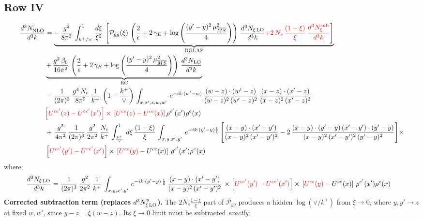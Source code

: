 \documentclass[9pt]{article}
\numberwithin{equation}{section}
\begin{document}
\subsection{Row IV}
\begin{align}
    \frac{d^{3}N_{\rm NLO}^{\rm}}{d^{3}k}  & =  
    \underbrace{-\,\frac{g^{2}}{8\pi^{2}}\,\int_{k^{+}/\vee}^{1}\, \frac{d\xi}{\xi^{2}}\,\left[\mathcal{P}_{gg}(\xi)\,\left(\frac{2}{\epsilon}+2\,\gamma_{E}+\log{\left(\frac{(y'-y)^{2}\,\mu^{2}_{\overline{MS}}}{4}\right)}\right)\,\frac{d^{3}N_{\xi\,\rm LO}}{d^{3}k}{\color{red}+2\,N_{c}\,\frac{(1-\xi)}{\xi}\,\frac{d^{3}N^{\rm sub}_{\xi}}{d^{3}k}} \right]}_{\rm DGLAP}\notag \\ & \underbrace{+\,\frac{g^{2}\,\beta_{0}}{16\pi^{2}}\,\left(\frac{2}{\epsilon}+2\,\gamma_{E}+\log{\left(\frac{(y'-y)^{2}\,\mu^{2}_{\overline{MS}}}{4}\right)}\right)\,\frac{d^{3}N_{\rm LO}}{d^{3}k}}_{\rm RC}\notag \\ &
    -\frac{1}{(2\pi)^{3}}\,\frac{g^{4}\,N_{c}}{8\pi^{5}}\,\frac{1}{k^{+}}\,\left(1-\frac{k^{+}}{\vee}\right)\,\int_{x,x',z,w,w'}\,e^{-ik\cdot (w'-w)}\,\frac{(w-z)\cdot(w'-z)}{(w-z)^{2}\,(w'-z)^{2}}\,\frac{(x-z)\cdot(x'-z)}{(x-z)^{2}\,(x'-z)^{2}}\notag \\
& {\color{red}\left[U^{ce'}(z) - U^{ce'}(x')\right] \times\, \left[U^{ce}(z) - U^{ce}(x)\right]}\, \rho^{e'}(x') \rho^{e}(x) \notag \\
&  +\,\frac{g^{2}}{4\pi^{2}}\, \frac{1}{(2\pi)^{3}}\,\frac{g^{2}}{2\pi^{2}}\, \frac{N_{c}}{k^{+}}\,\int_{\frac{k^{+}}{\vee}}^{1}\,d\xi\, \frac{(1-\xi)}{\xi}\, \int_{x,y,x',y'}\,e^{-ik\cdot (y'-y)\frac{1}{\xi}}\,\Bigg[\frac{(x-y)\cdot (x'-y')}{(x-y)^{2}\, (x'-y')^{2}} -2\,\frac{(x-y)\cdot (y'-y)\, (x'-y')\cdot (y'-y)}{(x-y)^{2}\,(x'-y')^{2}\,(y'-y)^{2}}\Bigg]\times\notag \\ &  \left[{\color{red}U^{ce'}(y') - U^{ce'}(x')}\right] \times\, \left[{\color{red}U^{ce}(y)} - U^{ce}(x)\right]\, \rho^{e'}(x') \rho^{e}(x)
\end{align}
where: 
\begin{align}
    \frac{d^{3}N_{\xi\,\rm LO}}{d^{3}k} & = \frac{1}{(2\pi)^{3}}\, \frac{g^{2}}{2\pi^{2}}\, \frac{1}{k^{+}}\,\int_{x,y,x',y'}\, e^{-ik\cdot (y'-y)\,\frac{1}{\xi}}\, \frac{(x-y)\cdot (x'-y')}{(x-y)^{2}\,(x'-y')^{2}}\,\times \left[{\color{red}U^{ce'}(y') - U^{ce'}(x')}\right] \times\, \left[{\color{red}U^{ce}(y)} - U^{ce}(x)\right]\, \rho^{e'}(x') \rho^{e}(x) 
\end{align}
{\color{red}%
\textbf{Corrected subtraction term (replaces $d^3N^{y}_{\xi\,\rm LO}$).} The $2N_c\frac{1-\xi}{\xi}$ part of $\mathcal P_{gg}$ produces a hidden $\log(\vee/k^+)$ from $\xi\to0$, where $y,y'\to z$ at fixed $w,w'$, since $y-z=\xi(w-z)$. Its $\xi\to0$ limit must be subtracted \emph{exactly}:}
\end{document}
